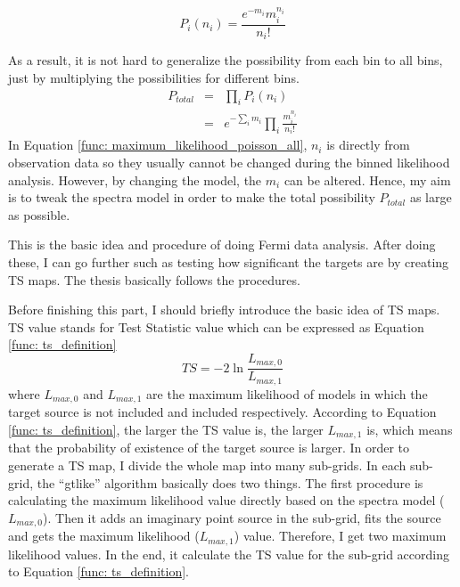 \documentclass[12pt]{report}
\begin{document}
      \begin{equation}
        P_{i}\left(n_{i}\right) = \frac{e^{-m_{i}} m_{i}^{n_{i}}}{n_{i}!}
        \label{func: maximum_likelihood_poisson}
      \end{equation}

      As a result, it is not hard to generalize the possibility from each bin to all bins, 
      just by multiplying the possibilities for different bins.
      \begin{eqnarray}
        P_{total} &=& \prod_{i}^{}P_{i}\left(n_{i}\right) \nonumber \\ 
                  &=& e^{-\sum_{i}^{}m_i}\prod_{i}^{}\frac{m_{i}^{n_i}}{n_i!}
        \label{func: maximum_likelihood_poisson_all}
      \end{eqnarray}
      In Equation \ref{func: maximum_likelihood_poisson_all}, $n_i$ is directly 
      from observation data so they usually cannot be changed during the binned likelihood 
      analysis. However, by changing the model, the $m_i$ can be altered. 
      Hence, my aim is to tweak the spectra model in order to make the total possibility 
      $P_{total}$ as large as possible. 

      This is the basic idea and procedure of doing Fermi data analysis. After doing these,
      I can go further such as testing how significant the targets are by creating TS 
      maps. The thesis basically follows the procedures. 

      Before finishing this part, I should briefly introduce the basic idea of TS maps. 
      TS value stands for Test Statistic value which can be expressed as Equation 
      \ref{func: ts_definition} 
      \begin{equation}
        TS = -2 \ln{\frac{L_{max,0}}{L_{max,1}}}
        \label{func: ts_definition}
      \end{equation}
      where $L_{max,0}$ and $L_{max,1}$ are the maximum likelihood of models in which the 
      target source is not included and included respectively. According to Equation 
      \ref{func: ts_definition}, the larger the TS value is, the larger $L_{max, 1}$ is, 
      which means that the probability of existence of the target source is larger. 
      In order to generate a TS map, I divide the whole map into many sub-grids. In each 
      sub-grid, the ``gtlike'' algorithm basically does two things. The first procedure is 
      calculating the maximum likelihood value directly based on the spectra model 
      ($L_{max,0}$). Then it adds an imaginary point source in the sub-grid, fits the source 
      and gets the maximum likelihood ($L_{max, 1}$) value. Therefore, I get two 
      maximum likelihood values. In the end, it calculate the TS value for the 
      sub-grid according to Equation \ref{func: ts_definition}. 
\end{document}
